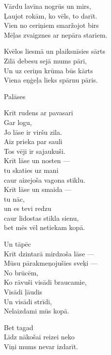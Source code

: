 \documentclass[14pt]{extarticle}
\begin{document}
Vārdu lavīna nogrūs un mirs,\\
Ļaujot rokām, ko vēls, to darīt.\\
Vien no ceriņiem smaržojot birs\\
Mēļas zvaigznes ar nepāra stariem.

Kvēlos liesmā un plaiksnīsies sārts\\
Zilā debesu sejā mums pāri,\\
Un uz ceriņu krūma būs kārts\\
Viena eņģeļa lieks spārnu pāris.



\newpage

{\large \sc Palāses}

Krīt rudens ar pavasari\\
Gar logu,\\
Jo lāse ir viršu zila.\\
Aiz prieka par sauli\\
Tos vēji ir sajaukuši.\\
Krīt lāse un nosten ---\\
\mbox{}\hspace{10pt}tu skaties uz mani\\
\mbox{}\hspace{10pt}caur aizejoša vagona stiklu.\\
Krīt lāse un smaida ---\\
\mbox{}\hspace{10pt}tu nāc,\\
\mbox{}\hspace{10pt}un es tevi redzu\\
\mbox{}\hspace{10pt}caur lidostas stikla sienu,\\
\mbox{}\hspace{10pt}bet mēs vēl netiekam kopā.

Un tāpēc\\
Krīt dzintarā mirdzoša lāse ---\\
Mūsu pārakmeņojušies sveķi ---\\
No brūcēm,\\
Ko rāvuši visādi braucamie,\\
Visādi ļāudis\\
Un visādi strīdi,\\
Nelaizdami mūs kopā.

Bet tagad\\
Līdz nākošai reizei neko\\
Viņi mums nevar izdarīt.
\end{document}
